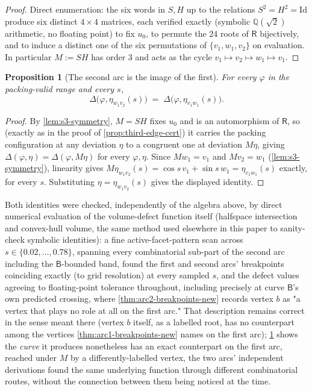 \documentclass[11pt,reqno]{amsart}
\renewcommand{\_}{\origunderscore\allowbreak}
\numberwithin{equation}{section}
\theoremstyle{plain}
\newtheorem{prop}[thm]{Proposition}
\theoremstyle{definition}
\theoremstyle{remark}
\newcommand{\Rt}{\mathsf{R}}                 %
\newcommand{\tilt}{\varphi}                  %
\newcommand{\arcp}{s}                        %
\newcommand{\dev}{\eta}                      %
\newcommand{\defect}{\Delta}                 %
\begin{document}
\begin{proof}
Direct enumeration: the six words in $S,H$ up to the relations
$S^2=H^2=\mathrm{Id}$ produce six distinct $4\times4$ matrices, each
verified exactly (symbolic $\mathbb{Q}(\sqrt2)$ arithmetic, no floating
point) to fix $u_0$, to permute the $24$ roots of $\Rt$ bijectively, and
to induce a distinct one of the six permutations of $\{v_1,w_1,v_2\}$ on
evaluation. In particular $M:=SH$ has order $3$ and acts as the cycle
$v_1\mapsto v_2\mapsto w_1\mapsto v_1$.
\end{proof}

\begin{prop}[The second arc is the image of the first]\label{prop:arc2-is-arc1}
For every $\tilt$ in the packing-valid range and every $\arcp$,
\[
  \defect\bigl(\tilt,\dev_{w_1v_2}(\arcp)\bigr) \;=\;
  \defect\bigl(\tilt,\dev_{v_1w_1}(\arcp)\bigr).
\]
\end{prop}

\begin{proof}
By \cref{lem:s3-symmetry}, $M=SH$ fixes $u_0$ and is an automorphism of
$\Rt$, so (exactly as in the proof of \cref{prop:third-edge-cert}) it
carries the packing configuration at any deviation $\eta$ to a
congruent one at deviation $M\eta$, giving
$\defect(\tilt,\eta)=\defect(\tilt,M\eta)$ for every $\tilt,\eta$. Since
$Mw_1=v_1$ and $Mv_2=w_1$ (\cref{lem:s3-symmetry}), linearity gives
$M\dev_{w_1v_2}(\arcp)=\cos\arcp\,v_1+\sin\arcp\,w_1=\dev_{v_1w_1}(\arcp)$
exactly, for every $\arcp$. Substituting $\eta=\dev_{w_1v_2}(\arcp)$
gives the displayed identity.
\end{proof}

Both identities were checked, independently of the algebra above, by
direct numerical evaluation of the volume-defect function itself
(halfspace intersection and convex-hull volume, the same method used
elsewhere in this paper to sanity-check symbolic identities): a
fine active-facet-pattern scan across $\arcp\in\{0.02,\dots,0.78\}$,
spanning every combinatorial sub-part of the second arc including the
$\mathsf B$-bounded band, found the first and second arcs' breakpoints
coinciding exactly (to grid resolution) at every sampled $\arcp$, and
the defect values agreeing to floating-point tolerance throughout, 
including precisely at curve $\mathsf B$'s own predicted crossing,
where \cref{thm:arc2-breakpoints-new} records vertex $b$ as "a vertex
that plays no role at all on the first arc." That description remains
correct in the sense meant there (vertex $b$ itself, as a labelled
root, has no counterpart among the vertices \cref{thm:arc1-breakpoints-new}
names on the first arc); \cref{prop:arc2-is-arc1} shows the
\emph{curve} it produces nonetheless has an exact counterpart on the
first arc, reached under $M$ by a differently-labelled vertex, the two
arcs' independent derivations found the same underlying function
through different combinatorial routes, without the connection between
them being noticed at the time.
\end{document}
